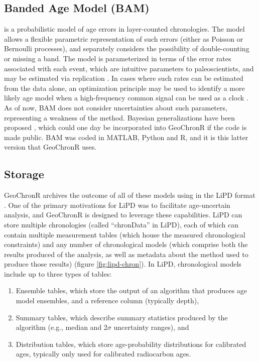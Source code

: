 \documentclass[gchron, manuscript]{copernicus}
\begin{document}
\subsection{Banded Age Model (BAM)}

\citet{BAM} is a probabilistic model of age errors in layer-counted chronologies.
The model allows a flexible parametric representation of such errors (either as Poisson or Bernoulli processes), and separately considers the possibility of double-counting or missing a band.
The model is parameterized in terms of the error rates associated with each event, which are intuitive parameters to paleoscientists, and may be estimated via replication \citep{DeLong_Paleo3_2013}.
In cases where such rates can be estimated from the data alone, an optimization principle may be used to identify a more likely age model when a high-frequency common signal can be used as a clock \citep{BAM}.
As of now, BAM does not consider uncertainties about such parameters, representing a weakness of the method.
Bayesian generalizations have been proposed \citep{BoersCP2017}, which could one day be incorporated into GeoChronR if the code is made public.
BAM was coded in MATLAB, Python and R, and it is this latter version that GeoChronR uses.

\hypertarget{sec:storage}{%
\subsection{Storage}\label{sec:storage}}

GeoChronR archives the outcome of all of these models using in the LiPD format \citep{lipd_cp}.
One of the primary motivations for LiPD was to facilitate age-uncertain analysis, and GeoChronR is designed to leverage these capabilities.
LiPD can store multiple chronologies (called ``chronData'' in LiPD), each of which can contain multiple measurement tables (which house the measured chronological constraints) and any number of chronological models (which comprise both the results produced of the analysis, as well as metadata about the method used to produce those results) (figure \ref{fig:lipd-chron}).
In LiPD, chronological models include up to three types of tables:

\begin{enumerate}
\def\labelenumi{\arabic{enumi}.}
\item
  Ensemble tables, which store the output of an algorithm that produces age model ensembles, and a reference column (typically depth),
\item
  Summary tables, which describe summary statistics produced by the algorithm (e.g., median and 2\(\sigma\) uncertainty ranges), and
\item
  Distribution tables, which store age-probability distributions for calibrated ages, typically only used for calibrated radiocarbon ages.
\end{enumerate}
\end{document}
